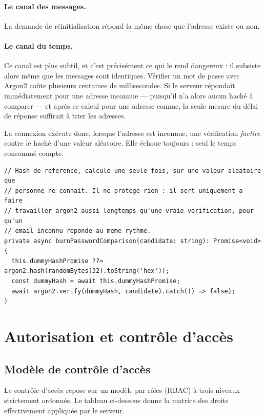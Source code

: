 \paragraph{Le canal des messages.} La demande de réinitialisation répond la
même chose que l'adresse existe ou non.

\paragraph{Le canal du temps.} Ce canal est plus subtil, et c'est précisément
ce qui le rend dangereux : il subsiste alors même que les messages sont
identiques. Vérifier un mot de passe avec Argon2 coûte plusieurs centaines de
millisecondes. Si le serveur répondait immédiatement pour une adresse inconnue
--- puisqu'il n'a alors aucun haché à comparer --- et après ce calcul pour une
adresse connue, la seule mesure du délai de réponse suffirait à trier les
adresses.

La connexion exécute donc, lorsque l'adresse est inconnue, une vérification
\emph{factice} contre le haché d'une valeur aléatoire. Elle échoue toujours :
seul le temps consommé compte.

\begin{lstlisting}[caption={Uniformisation du temps de réponse à la connexion},captionpos=b]
// Hash de reference, calcule une seule fois, sur une valeur aleatoire que
// personne ne connait. Il ne protege rien : il sert uniquement a faire
// travailler argon2 aussi longtemps qu'une vraie verification, pour qu'un
// email inconnu reponde au meme rythme.
private async burnPasswordComparison(candidate: string): Promise<void> {
  this.dummyHashPromise ??= argon2.hash(randomBytes(32).toString('hex'));
  const dummyHash = await this.dummyHashPromise;
  await argon2.verify(dummyHash, candidate).catch(() => false);
}
\end{lstlisting}

\section{Autorisation et contrôle d'accès}

\subsection{Modèle de contrôle d'accès}

Le contrôle d'accès repose sur un modèle par rôles (RBAC) à trois niveaux
strictement ordonnés. Le tableau ci-dessous donne la matrice des droits
effectivement appliquée par le serveur.

